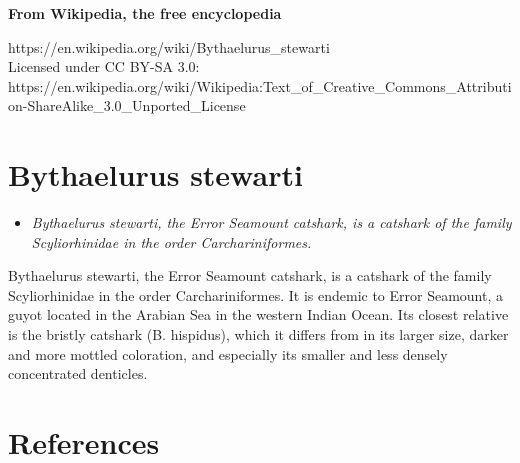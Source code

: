 \textbf{From Wikipedia, the free encyclopedia}

https://en.wikipedia.org/wiki/Bythaelurus\_stewarti\\
Licensed under CC BY-SA 3.0:\\
https://en.wikipedia.org/wiki/Wikipedia:Text\_of\_Creative\_Commons\_Attribution-ShareAlike\_3.0\_Unported\_License

\section{Bythaelurus stewarti}\label{bythaelurus-stewarti}

\begin{itemize}
\item
  \emph{Bythaelurus stewarti, the Error Seamount catshark, is a catshark
  of the family Scyliorhinidae in the order Carchariniformes.}
\end{itemize}

Bythaelurus stewarti, the Error Seamount catshark, is a catshark of the
family Scyliorhinidae in the order Carchariniformes. It is endemic to
Error Seamount, a guyot located in the Arabian Sea in the western Indian
Ocean. Its closest relative is the bristly catshark (B. hispidus), which
it differs from in its larger size, darker and more mottled coloration,
and especially its smaller and less densely concentrated denticles.

\section{References}\label{references}
